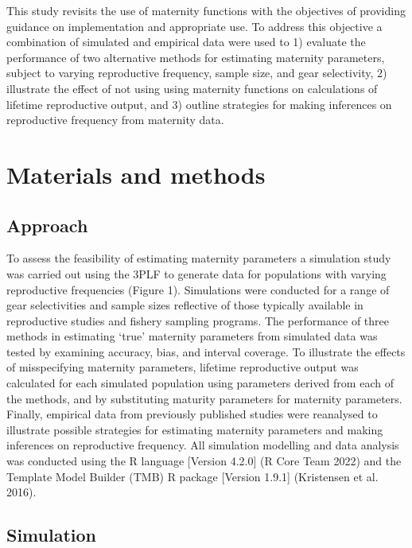 \documentclass[
]{article}
\begin{document}
This study revisits the use of maternity functions with the objectives of providing guidance on implementation and appropriate use. To address this objective a combination of simulated and empirical data were used to 1) evaluate the performance of two alternative methods for estimating maternity parameters, subject to varying reproductive frequency, sample size, and gear selectivity, 2) illustrate the effect of not using using maternity functions on calculations of lifetime reproductive output, and 3) outline strategies for making inferences on reproductive frequency from maternity data.

\section{Materials and methods}\label{materials-and-methods}

\subsection{Approach}\label{approach}

To assess the feasibility of estimating maternity parameters a simulation study was carried out using the 3PLF to generate data for populations with varying reproductive frequencies (Figure 1). Simulations were conducted for a range of gear selectivities and sample sizes reflective of those typically available in reproductive studies and fishery sampling programs. The performance of three methods in estimating `true' maternity parameters from simulated data was tested by examining accuracy, bias, and interval coverage. To illustrate the effects of misspecifying maternity parameters, lifetime reproductive output was calculated for each simulated population using parameters derived from each of the methods, and by substituting maturity parameters for maternity parameters. Finally, empirical data from previously published studies were reanalysed to illustrate possible strategies for estimating maternity parameters and making inferences on reproductive frequency. All simulation modelling and data analysis was conducted using the R language {[}Version 4.2.0{]} (R Core Team 2022) and the Template Model Builder (TMB) R package {[}Version 1.9.1{]} (Kristensen et al. 2016).

\subsection{Simulation}\label{simulation}
\end{document}
